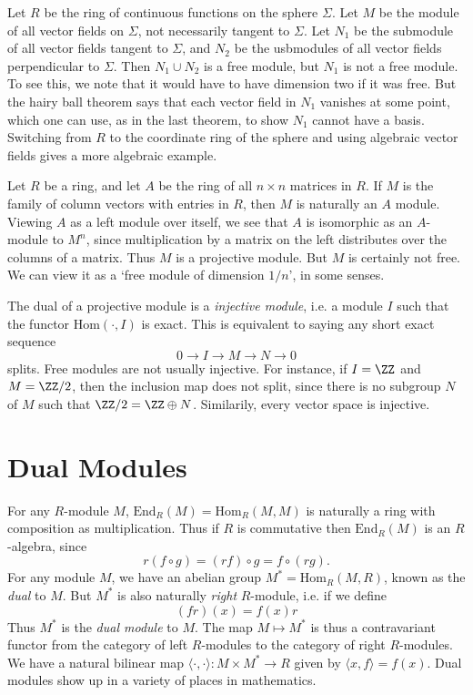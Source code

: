 \begin{example}
    Let $R$ be the ring of continuous functions on the sphere $\Sigma$. Let $M$ be the module of all vector fields on $\Sigma$, not necessarily tangent to $\Sigma$. Let $N_1$ be the submodule of all vector fields tangent to $\Sigma$, and $N_2$ be the usbmodules of all vector fields perpendicular to $\Sigma$. Then $N_1 \cup N_2$ is a free module, but $N_1$ is not a free module. To see this, we note that it would have to have dimension two if it was free. But the hairy ball theorem says that each vector field in $N_1$ vanishes at some point, which one can use, as in the last theorem, to show $N_1$ cannot have a basis. Switching from $R$ to the coordinate ring of the sphere and using algebraic vector fields gives a more algebraic example.
\end{example}

\begin{example}
    Let $R$ be a ring, and let $A$ be the ring of all $n \times n$ matrices in $R$. If $M$ is the family of column vectors with entries in $R$, then $M$ is naturally an $A$ module. Viewing $A$ as a left module over itself, we see that $A$ is isomorphic as an $A$-module to $M^n$, since multiplication by a matrix on the left distributes over the columns of a matrix. Thus $M$ is a projective module. But $M$ is certainly not free. We can view it as a `free module of dimension $1/n$', in some senses.
\end{example}

The dual of a projective module is a \emph{injective module}, i.e. a module $I$ such that the functor $\text{Hom}(\cdot,I)$ is exact. This is equivalent to saying any short exact sequence
%
\[ 0 \to I \to M \to N \to 0 \]
%
splits. Free modules are not usually injective. For instance, if $I = \ZZ$ and $M = \ZZ/2$, then the inclusion map does not split, since there is no subgroup $N$ of $M$ such that $\ZZ/2 = \ZZ \oplus N$. Similarily, every vector space is injective.

\section{Dual Modules}

For any $R$-module $M$, $\text{End}_R(M) = \text{Hom}_R(M,M)$ is naturally a ring with composition as multiplication. Thus if $R$ is commutative then $\text{End}_R(M)$ is an $R$-algebra, since
%
\[ r (f \circ g) = (rf) \circ g = f \circ (rg). \]
%
For any module $M$, we have an abelian group $M^* = \text{Hom}_R(M,R)$, known as the \emph{dual} to $M$. But $M^*$ is also naturally \emph{right} $R$-module, i.e. if we define
%
\[ (fr)(x) = f(x) r \]
%
Thus $M^*$ is the \emph{dual module} to $M$. The map $M \mapsto M^*$ is thus a contravariant functor from the category of left $R$-modules to the category of right $R$-modules. We have a natural bilinear map $\langle \cdot, \cdot \rangle: M \times M^* \to R$ given by $\langle x, f \rangle = f(x)$. Dual modules show up in a variety of places in mathematics.

